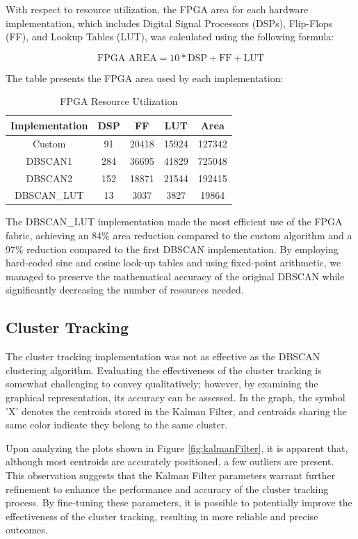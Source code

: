 \documentclass[journal]{IEEEtran} %
\begin{document}
With respect to resource utilization, the FPGA area for each hardware implementation, which includes Digital Signal Processors (DSPs), Flip-Flops (FF), and Lookup Tables (LUT), was calculated using the following formula:

\[ 
\text{FPGA AREA} = 10 * \text{DSP} + \text{FF} + \text{LUT}
\]

The table presents the FPGA area used by each implementation:

\begin{table}[h]
\centering
\begin{tabular}{|c|c|c|c|c|}
\hline
\textbf{Implementation} & \textbf{DSP} & \textbf{FF} & \textbf{LUT} & \textbf{Area} \\
\hline
Custom & 91 & 20418 & 15924 & 127342 \\
DBSCAN1 & 284 & 36695 & 41829 & 725048 \\
DBSCAN2 & 152 & 18871 & 21544 & 192415 \\
DBSCAN\_LUT & 13 & 3037 & 3827 & 19864 \\
\hline
\end{tabular}
\caption{FPGA Resource Utilization}
\label{table:fpga_resource_utilization}
\end{table}

The DBSCAN\_LUT implementation made the most efficient use of the FPGA fabric, achieving an 84\% area reduction compared to the custom algorithm and a 97\% reduction compared to the first DBSCAN implementation. By employing hard-coded sine and cosine look-up tables and using fixed-point arithmetic, we managed to preserve the mathematical accuracy of the original DBSCAN while significantly decreasing the number of resources needed.


\subsection{Cluster Tracking}
The cluster tracking implementation was not as effective as the DBSCAN clustering algorithm. Evaluating the effectiveness of the cluster tracking is somewhat challenging to convey qualitatively; however, by examining the graphical representation, its accuracy can be assessed. In the graph, the symbol 'X' denotes the centroids stored in the Kalman Filter, and centroids sharing the same color indicate they belong to the same cluster.

Upon analyzing the plots shown in Figure \ref{fig:kalmanFilter}, it is apparent that, although most centroids are accurately positioned, a few outliers are present. This observation suggests that the Kalman Filter parameters warrant further refinement to enhance the performance and accuracy of the cluster tracking process. By fine-tuning these parameters, it is possible to potentially improve the effectiveness of the cluster tracking, resulting in more reliable and precise outcomes.
\end{document}
